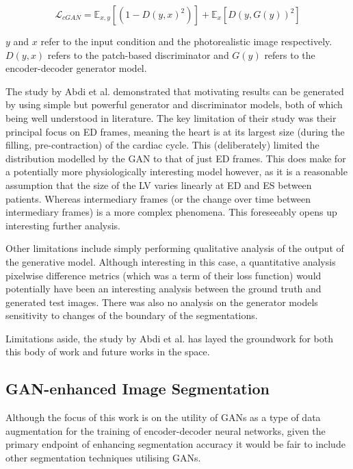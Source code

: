 \begin{equation}
        \mathcal{L}_{cGAN} = \mathbb{E}_{x,y}[(1-D(y,x)^{2})] + \mathbb{E}_{x}[D(y,G(y))^2]
\end{equation} \newline

$y$ and $x$ refer to the input condition and the photorealistic image
respectively. $D(y,x)$ refers to the patch-based discriminator and $G(y)$
refers to the encoder-decoder generator model. \newline

The study by Abdi et al. demonstrated that motivating results can be generated by using
simple but powerful generator and discriminator models, both of which being well
understood in literature. The key limitation of their study was their principal
focus on ED frames, meaning the heart is at its largest size (during the
filling, pre-contraction) of the cardiac cycle. This (deliberately) limited the
distribution modelled by the GAN to that of just ED frames. This does make for a
potentially more physiologically interesting model however, as it is a
reasonable assumption that the size of the LV varies linearly at ED and ES
between patients. Whereas intermediary frames (or the change over time between
intermediary frames) is a more complex phenomena. This foreseeably opens up
interesting further analysis. \newline

Other limitations include simply performing qualitative analysis of the output
of the generative model. Although interesting in this case, a quantitative
analysis pixelwise difference metrics (which was a term of their loss function)
would potentially have been an interesting analysis between the ground truth and
generated test images. There was also no analysis on the generator models
sensitivity to changes of the boundary of the segmentations. \newline

Limitations aside, the study by Abdi et al. has layed the groundwork for both this body of
work and future works in the space. \newline

\subsection{GAN-enhanced Image Segmentation}

Although the focus of this work is on the utility of GANs as a type of data
augmentation for the training of encoder-decoder neural networks, given the
primary endpoint of enhancing segmentation accuracy it would be fair to include
other segmentation techniques utilising GANs. \newline

